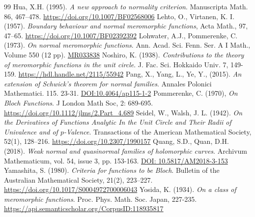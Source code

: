 \documentclass[11pt, reqno]{amsart}
\theoremstyle{definition}
\theoremstyle{remark}
\numberwithin{equation}{section}
\begin{document}
\begin{thebibliography}{99}
 \label{hua-anatnc-1995} Hua, X.H. (1995). \textit{A new approach to normality criterion}. Manuscripta Math. 86, 467–478. \url{https://doi.org/10.1007/BF02568006}
 \label{lehto-bbanmf-1957} Lehto, O., Virtanen, K. I. (1957). \textit{Boundary behaviour and normal meromorphic functions}, Acta Math., 97, 47–65. \url{https://doi.org/10.1007/BF02392392}
 \label{lohwater-onmf-1973} Lohwater, A.J., Pommerenke, C. (1973). \textit{On normal meromorphic functions}. Ann. Acad. Sci. Fenn. Ser. A I Math., Volume 550 (12 pp). \url{MR033838}
 \label{noshiro-ctttomfituc-1938}  Noshiro, K. (1938). \textit{Contributions to the theory of meromorphic functions in the unit circle}. J. Fac. Sci. Hokkaido
Univ. 7, 149-159. \url{https://hdl.handle.net/2115/55942}
 \label{pang-aeostfnf-2015} Pang, X., Yang, L., Ye, Y., (2015). \textit{An extension of Schwick's theorem for normal families}. Annales Polonici Mathematici. 115. 23-31. \url{DOI:10.4064/ap115-1-2} 
 \label{pommerenke-obf-1970} Pommerenke, C. (1970), \textit{On Bloch Functions}. J London Math Soc, 2: 689-695. \url{https://doi.org/10.1112/jlms/2.Part_4.689}
 \label{seidel-otdofaitucatrouaopv-1942} Seidel, W., Walsh, J. L. (1942). \textit{On the Derivatives of Functions Analytic In the Unit Circle and Their Radii of Univalence and of $p$-Valence}. Transactions of the American Mathematical Society, 52(1), 128–216. \url{https://doi.org/10.2307/1990157}
 \label{quang-wnaqfohc-2018} Quang, S.D., Quan, D.H. (2018). \textit{Weak normal and quasinormal families of holomorphic curves}. Archivum Mathematicum, vol. 54, issue 3, pp. 153-163. \url{DOI: 10.5817/AM2018-3-153} 
 \label{yamashita-cfftbb-1980} Yamashita, S. (1980). \textit{Criteria for functions to be Bloch}. Bulletin of the Australian Mathematical Society, 21(2), 223–227. \url{https://doi.org/10.1017/S0004972700006043}
 \label{yosida-oacomf-1934} Yosida, K. (1934). \textit{On a class of meromorphic functions}. Proc. Phys. Math. Soc. Japan, 227-235. \url{https://api.semanticscholar.org/CorpusID:118935817}
\end{thebibliography}
\end{document}
